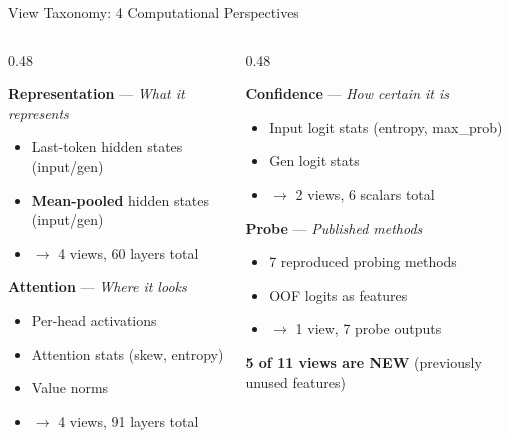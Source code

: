 \documentclass[aspectratio=169,14pt]{beamer}
\begin{document}
\begin{frame}{View Taxonomy: 4 Computational Perspectives}

\begin{columns}[T]
\begin{column}{0.48\textwidth}

\textbf{\textcolor{primary}{Representation}} — \textit{What it represents}
\begin{itemize}
    \item Last-token hidden states (input/gen)
    \item \textbf{Mean-pooled} hidden states (input/gen)
    \item {\small $\rightarrow$ 4 views, 60 layers total}
\end{itemize}

\vspace{0.5em}
\textbf{\textcolor{accent}{Attention}} — \textit{Where it looks}
\begin{itemize}
    \item Per-head activations
    \item Attention stats (skew, entropy)
    \item Value norms
    \item {\small $\rightarrow$ 4 views, 91 layers total}
\end{itemize}

\end{column}
\begin{column}{0.48\textwidth}

\textbf{\textcolor{wingreen}{Confidence}} — \textit{How certain it is}
\begin{itemize}
    \item Input logit stats (entropy, max\_prob)
    \item Gen logit stats
    \item {\small $\rightarrow$ 2 views, 6 scalars total}
\end{itemize}

\vspace{0.5em}
\textbf{Probe} — \textit{Published methods}
\begin{itemize}
    \item 7 reproduced probing methods
    \item OOF logits as features
    \item {\small $\rightarrow$ 1 view, 7 probe outputs}
\end{itemize}

\vspace{0.5em}
{\small \textcolor{primary}{\textbf{5 of 11 views are NEW}} (previously unused features)}

\end{column}
\end{columns}

\end{frame}
\end{document}
